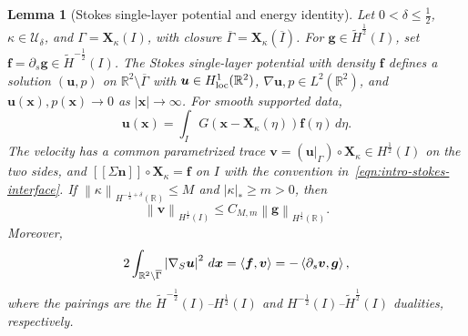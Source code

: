 \documentclass[11pt,reqno]{amsart}
\theoremstyle{plain}
\newtheorem{lemma}[theorem]{Lemma}
\theoremstyle{definition}
\numberwithin{equation}{section}
\newcommand{\jump}[1]{\left[\!\left[ #1\right]\!\right]}
\newcommand{\p}{\partial}
\newcommand{\grad}[1]{\nabla #1}
\newcommand{\mc}[1]{\mathcal{#1}}
\newcommand{\wt}[1]{\widetilde{#1}}
\newcommand{\bm}[1]{\boldsymbol{#1}}
\newcommand{\abs}[1]{\left\lvert #1 \right\rvert}
\newcommand{\norm}[1]{\left\lVert #1 \right\rVert}
\newcommand{\dual}[2]{\left\langle #1,#2 \right\rangle}
\newcommand{\R}{\mathbb{R}}
\newcommand{\xk}{\bm X_\kappa}
\newcommand{\hi}[1]{H^{#1}(I)}
\newcommand{\hr}[1]{H^{#1}(\R)}
\begin{document}
\begin{lemma}[Stokes single-layer potential and energy identity]\label{lem:stokes-layer-open-arc}\label{lem:weak-stokes-open-arc}
Let $0<\delta\le\frac12$, $\kappa\in\mc U_\delta$, and
$\Gamma=\xk(I)$, with closure $\overline{\Gamma}=\xk(\overline I)$. For
$\bm g\in\wt H^{\frac12}(I)$, set
$\bm f=\p_s\bm g\in\wt H^{-\frac12}(I)$.
The Stokes single-layer potential with density $\bm f$ defines a solution
$(\bm u,p)$ on $\R^2\setminus\overline{\Gamma}$ with
$\bm u\in H^1_{\rm loc}(\R^2)$, $\grad\bm u,p\in L^2(\R^2)$, and
$\bm u(\bm x),p(\bm x)\to0$ as $|\bm x|\to\infty$.
For smooth supported data,
\begin{equation}\label{eqn:stokes-single-layer}
    \bm u(\bm x)=\int_I G(\bm x-\xk(\eta))\bm f(\eta)\,d\eta.
\end{equation}
The velocity has a common parametrized trace
$\bm v=(\bm u|_\Gamma)\circ\xk\in H^{\frac12}(I)$ on the two sides, and
$\jump{\Sigma\bm n}\circ\xk=\bm f$ on $I$ with the convention
in~\eqref{eqn:intro-stokes-interface}.
If $\norm{\kappa}_{\hr{-\frac12+\delta}}\le M$ and
$\abs{\kappa}_*\ge m>0$, then
\begin{equation}\label{eqn:stokes-layer-bound}
    \norm{\bm v}_{\hi{\frac12}}
    \le C_{M,m}\norm{\bm g}_{\hr{\frac12}}.
\end{equation}
Moreover,
\begin{equation}\label{eqn:weak-stokes-energy}
    2\int_{\R^2\setminus\overline{\Gamma}}\abs{\grad_S\bm u}^2\,d\bm x
    =\dual{\bm f}{\bm v}
    =-\dual{\p_s\bm v}{\bm g},
\end{equation}
where the pairings are the
$\wt H^{-\frac12}(I)$--$H^{\frac12}(I)$ and
$H^{-\frac12}(I)$--$\wt H^{\frac12}(I)$ dualities, respectively.
\end{lemma}
\end{document}
